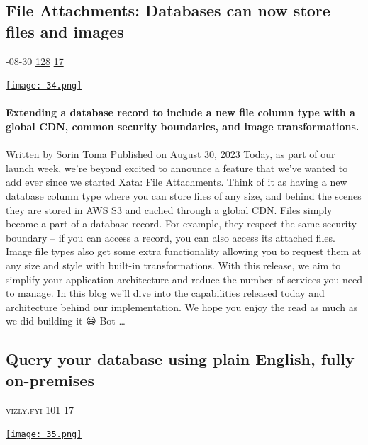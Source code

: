 \documentclass[10pt,a4paper]{article}
\begin{document}
\begin{multicols}{2}
\begin{minipage}{\linewidth}
\subsection{File Attachments: Databases can now store files and images}
\textsc{\footnotesize
{\scriptsize\faCalendar}-08-30 
{\scriptsize\faThumbsOUp}\space 
\href{http://news.ycombinator.com/item?id=37324370\&utm\_term=comment}{128} 
{\scriptsize\faComments}\space 
\href{http://news.ycombinator.com/item?id=37324370\&utm\_term=comment}{17} 
}
\par\medskip\noindent
\href{https://xata.io/blog/file-attachments?utm\_source=hackernewsletter\&utm\_medium=email\&utm\_term=data}{
    \texttt{[image: 34.png]}
}
\end{minipage}
\paragraph{}
\textbf{Extending a database record to include a new file column type with a global CDN, common security boundaries, and image transformations.}
\paragraph{}

Written by
Sorin Toma
Published on
August 30, 2023
Today, as part of our launch week, we’re beyond excited to announce a feature that we've wanted to add ever since we started Xata: File Attachments. Think of it as having a new database column type where you can store files of any size, and behind the scenes they are stored in AWS S3 and cached through a global CDN. Files simply become a part of a database record. For example, they respect the same security boundary -- if you can access a record, you can also access its attached files. Image file types also get some extra functionality allowing you to request them at any size and style with built-in transformations. With this release, we aim to simplify your application architecture and reduce the number of services you need to manage.
In this blog we'll dive into the capabilities released today and architecture behind our implementation. We hope you enjoy the read as much as we did building it 😃
Bot
\dots\par
\noindent\begin{minipage}{\linewidth}
\medskip
\subsection{Query your database using plain English, fully on-premises}
\textsc{\footnotesize
{\scriptsize\faGlobe}\space 
vizly.fyi 
{\scriptsize\faThumbsOUp}\space 
\href{http://news.ycombinator.com/item?id=37315667\&utm\_term=comment}{101} 
{\scriptsize\faComments}\space 
\href{http://news.ycombinator.com/item?id=37315667\&utm\_term=comment}{17} 
}
\par\medskip\noindent
\href{https://www.vizly.fyi/?utm\_source=hackernewsletter\&utm\_medium=email\&utm\_term=data}{
    \texttt{[image: 35.png]}
}
\end{minipage}

\end{multicols}
\end{document}
